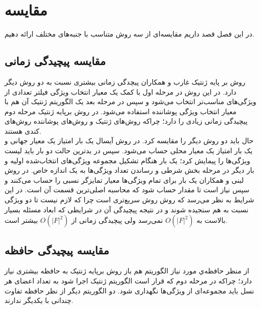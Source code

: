 \chapter{مقایسه}
در این فصل قصد داریم مقایسه‌ای از سه روش متناسب با جنبه‌های مختلف ارائه دهیم.

\section{مقایسه پیچیدگی زمانی}
روش بر پایه ژنتیک غارب و همکاران \cite{ghareb2016hybrid} پیچدگی زمانی بیشتری نسبت به دو روش دیگر دارد. در این روش در مرحله اول با کمک یک معیار انتخاب ویژگی فیلتر تعدادی از ویژگی‌های مناسب‌تر انتخاب می‌شود و سپس در مرحله بعد یک الگوریتم ژنتیک آن هم با معیار انتخاب ویژگی پوشاننده استفاده می‌شود. در روش برپایه ژنتیک مرحله دوم پیچیدگی زمانی زیادی را دارد؛ چراکه روش‌های ژنتیک و روش‌های پوشاننده روش‌های کندی هستند.
\\

حال باید دو روش دیگر را مقایسه کرد. در روش  آیسال یک بار امتیاز یک معیار جهانی و یک بار امتیاز یک معیار محلی حساب می‌شود. سپس در بدترین حالت دو بار باید لیست ویژگی‌ها را پیمایش کرد؛ یک بار هنگام تشکیل مجموعه ویژگی‌های انتخاب‌شده اولیه و بار دیگر در مرحله بخش شرطی و رساندن تعداد ویژگی‌ها به یک اندازه خاص.\cite{uysal2016improved} در روش  لبنی و همکاران یک بار برای تمام ویژگی‌ها معیار تمایزگر نسبی را حساب می‌کنند و سپس نیاز است تا مقدار  حساب شود که محاسبه  اصلی‌ترین قسمت آن است.\cite{labani2018novel} در این شرایط به نظر می‌رسد که روش  روش سریع‌تری است چرا که لازم نیست تا دو ویژگی نسبت به هم سنجیده شوند و در نتیجه پیچیدگی آن در شرایطی که ابعاد مسئله بسیار بالاست به
$O(|F|^2)$
نمی‌رسد ولی پیچیدگی زمانی  از
$O(|F|^2)$
بیشتر است.


\section{مقایسه پیچیدگی حافظه}  
از منظر حافظه‌ي مورد نیاز الگوریتم هم باز روش برپایه ژنتیک به حافظه بیشتری نیاز دارد؛ چراکه در مرحله دوم که قرار است الگوریتم ژنتیک اجرا شود به تعداد اعضای هر نسل باید مجموعه‌ای از ويژگی‌ها نگهداری شود. دو الگوریتم دیگر از نظر حافظه تفاوت چندانی با یکدیگر ندارند.

